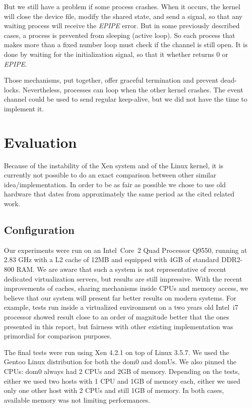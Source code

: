 \documentclass[journal]{IEEEtran}
\begin{document}
But we still have a problem if some process crashes. When it occurs, the kernel will close the device file, modify the shared state, and send a signal, so that any waiting process will receive the \emph{EPIPE} error. But in some previously described cases, a process is prevented from sleeping (active loop). So each process that makes more than a fixed number loop must check if the channel is still open. It is done by waiting for the initialization signal, so that it whether returns 0 or \emph{EPIPE}. 

Those mechanisms, put together, offer graceful termination and prevent dead-locks. Nevertheless, processes can loop when the other kernel crashes. The event channel could be used to send regular keep-alive, but we did not have the time to implement it.  

\section{Evaluation}

Because of the instability of the Xen system and of the Linux kernel, it is currently not possible to do an exact comparison between other similar idea/implementation. In order to be as fair as possible we chose to use old hardware that dates from approximately the same period as the cited related work.

\subsection{Configuration}

Our experiments were run on an Intel\textregistered ~Core\texttrademark ~2 Quad Processor Q9550, running at 2.83 GHz with a L2 cache of 12MB and equipped with 4GB of standard DDR2-800 RAM. We are aware that such a system is not representative of recent dedicated virtualization servers, but results are still impressive.
With the recent improvements of caches, sharing mechanisms inside CPUs and memory access, we believe that our system will present far better results on modern systems. For example, tests run inside a virtualized environment on a two years old Intel\textregistered ~i7 processor showed result close to an order of magnitude better that the ones presented in this report, but fairness with other existing implementation was primordial for comparison purposes.

The final tests were run using Xen 4.2.1 on top of Linux 3.5.7. We used the Gentoo Linux distribution for both the dom0 and domUs. We also pinned the CPUs: dom0 always had 2 CPUs and 2GB of memory. Depending on the tests, either we used two hosts with 1 CPU and 1GB of memory each, either we used only one other host with 2 CPUs and still 1GB of memory. In both cases, available memory was not limiting performances.
\end{document}
